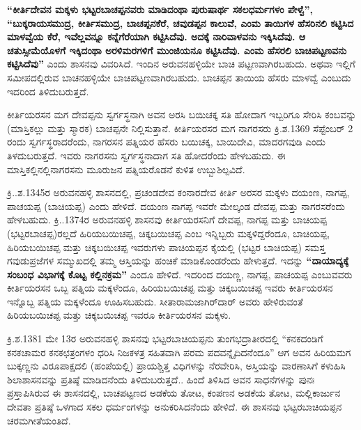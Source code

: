\textbf{“ಕೀರ್ತಿದೇವನ ಮಕ್ಕಳು ಭಟ್ಟರಬಾಚಪ್ಪನವರು ಮಾಡಿದಂಥಾ ಪುರುಷಾರ್ಥ ಸಕಲಧರ್ಮಗಳಂ ಪೇಳ್ವೆ”,\general{\break } “ಬುಕ್ಕರಾಯಸಮುದ್ರ, ಕೀರ್ತಿಸಮುದ್ರ, ಬಾಚಪ್ಪನಕೆರೆ, ಚವುಡಪ್ಪನ ಕಾಲುವೆ, ಎಂಮ ತಾಯಿಗಳ ಹೆಸರಿನಲಿ ಕಟ್ಟಿಸಿದ ಮಾಳವ್ವೆಯ ಕೆರೆ, ಇವೆಲ್ಲವನ್ನೂ ಕನ್ನೆಗೆರೆಯಾಗಿ ಕಟ್ಟಿಸಿದೆವು. ಅದಕ್ಕೆ ನಾರಿವಾಳವನು ಇಕ್ಕಿಸಿದೆವು. ಆ ಚತುಸ್ಸೀಮೆಯೊಳಗೆ ಇಕ್ಕಿದಂಥಾ ಅರಳಿಮರಗಳಿಗೆ ಮುಂಜಿಯನೂ ಕಟ್ಟಿಸಿದೆವು. ಎಂಮ ಹೆಸರಲಿ ಬಾಚಿಪಟ್ಟಣವನು ಕಟ್ಟಿಸಿದೆವು”} ಎಂದು ಶಾಸನವು ವಿವರಿಸಿದೆ. ಇಂದಿನ ಅರುವನಹಳ್ಳಿಯೇ ಬಾಚಿ ಪಟ್ಟಣವಾಗಿರಬಹುದು. ಅಥವಾ ಇಲ್ಲಿಗೆ ಸಮೀಪದಲ್ಲಿರುವ ಬಾಚನಹಳ್ಳಿಯೇ ಬಾಚಿಪಟ್ಟಣವಾಗಿರಬಹುದು. ಬಾಚಪ್ಪನ ತಾಯಿಯ ಹೆಸರು ಮಾಳವ್ವೆ ಎಂಬುದು ಇದರಿಂದ ತಿಳಿದುಬರುತ್ತದೆ.

ಕೀರ್ತಿಯರಸನ ಮಗ ದೇವಪ್ಪನು ಸ್ವರ್ಗಸ್ಥನಾಗಿ ಅವನ ಅರಸಿ ಬಯಿಚಕ್ಕ ಸತಿ ಹೋದಾಗ ಇಬ್ಬರಿಗೂ ಸೇರಿಸಿ ಕಂಬವನ್ನು (ಮಾಸ್ತಿಕಲ್ಲು ಮತ್ತು ಸ್ಮಾರಕ) ಬಾಚಪ್ಪನೇ ನಿಲ್ಲಿಸುತ್ತಾನೆ. ಕೀರ್ತಿಯರಸರ ಮಗ ನಾಗರಸರು ಕ್ರಿ.ಶ.1369 ಸೆಪ್ಟೆಂಬರ್​ 2 ರಂದು ಸ್ವರ್ಗಸ್ಥರಾದರೆಂದು, ನಾಗರಸನ ಪತ್ನಿಯರ ಹೆಸರು ಬಯಿಚಕ್ಕ, ಬಾಯಿದೇವಿ, ಮಾದರಗವುಡಿ ಎಂದು ತಿಳದುಬರುತ್ತದೆ. ಇವರು ನಾಗರಸನು ಸ್ವರ್ಗಸ್ಥನಾದಾಗ ಸತಿ ಹೋದರೆಂದು ಹೇಳಬಹುದು. ಈ ಮಾಸ್ತಿಕಲ್ಲಿನಲ್ಲಿ\break ನಾಗರಸನು ಮೂರುಜನ ಪತ್ನಿಯರೊಡನೆ ಕುಳಿತ ಉಬ್ಬುಶಿಲ್ಪವಿದೆ.

ಕ್ರಿ..ಶ.1345ರ ಅರುವನಹಳ್ಳಿ ಶಾಸನದಲ್ಲಿ, ಪ್ರಚಂಡದೇವ ಕಂನಾರದೇವ ಕೀರ್ತಿ ಅರಸರ ಮಕ್ಕಳು ದಯಂಣ, ನಾಗಪ್ಪ, ಪಾಚಯಪ್ಪ (ಬಾಚಿಯಪ್ಪ) ಎಂದು ಹೇಳಿದೆ. ದಯಂಣ ನಾಗಪ್ಪ ಇವರೇ ಮೇಲ್ಕಂಡ ದೇವಪ್ಪ ಮತ್ತು ನಾಗರಸರೆಂದು ಹೇಳಬಹುದು. ಕ್ರಿ..1374ರ ಅರುವನಹಳ್ಳಿ ಶಾಸನವು ಕೀರ್ತಿಯರಸನಿಗೆ ದೇವಪ್ಪ, ನಾಗಪ್ಪ ಮತ್ತು ಬಾಚಿಯಪ್ಪ (ಭಟ್ಟರಬಾಚಪ್ಪ)ರಲ್ಲದೆ ಹಿರಿಯಬಯಿಚಪ್ಪ, ಚಿಕ್ಕಬಯಿಚಪ್ಪ ಎಂಬ ಇನ್ನಿಬ್ಬರು ಮಕ್ಕಳಿದ್ದರೆಂದೂ, ಬಾಚಿಯಪ್ಪ, ಹಿರಿಯಬಯಿಚಪ್ಪ ಮತ್ತು ಚಿಕ್ಕಬಯಿಚಪ್ಪ ಇವರುಗಳು ಪಾಚಿಯಪ್ಪನ ಕೈಯಲ್ಲಿ (ಭಟ್ಟರ ಬಾಚಿಯಪ್ಪ) ಸಮಸ್ತ ಗವುಡುಪ್ರಜೆಗಳ ಸಮ್ಮುಖದಲ್ಲಿ ತಮ್ಮ ಆಸ್ತಿಯನ್ನು ಹಂಚಿಕೆ ಮಾಡಿಕೊಂಡರೆಂದು ಹೇಳುತ್ತದೆ. ಇದನ್ನು \textbf{“ದಾಯಾದ್ಯಕ್ಕೆ ಸಂಬಂಧ ವಿಭಾಗಕ್ಕೆ ಕೊಟ್ಟ ಕಲ್ಲಿನಕ್ರಮ”} ಎಂದೂ ಹೇಳಿದೆ. ಇದರಿಂದ ದಯಣ್ಣ, ನಾಗಪ್ಪ, ಪಾಚಯಪ್ಪ ಎಂಬುವವರು ಕೀರ್ತಿಯರಸನ ಒಬ್ಬ ಪತ್ನಿಯ ಮಕ್ಕಳೆಂದೂ, ಹಿರಿಯಬಯಿಚಪ್ಪ ಮತ್ತು ಚಿಕ್ಕಬಯಿಚಪ್ಪ ಇವರು ಕೀರ್ತಿಯರಸನ ಇನ್ನೊಬ್ಬ ಪತ್ನಿಯ ಮಕ್ಕಳೆಂದೂ ಊಹಿಸಬಹುದು. ಸೀತಾರಾಮಜಾಗಿರ್​ದಾರ್​ ಅವರು ಹೇಳಿರುವಂತೆ ಹಿರಿಯಬಯಿಚಪ್ಪ ಮತ್ತು ಚಿಕ್ಕಬಯಿಚಪ್ಪ ಇವರೂ ಕೀರ್ತಿಯರಸನ ಮಕ್ಕಳು.

ಕ್ರಿ.ಶ.1381 ಮೇ 13ರ ಅರುವನಹಳ್ಳಿ ಶಾಸನವು ಭಟ್ಟರಬಾಚಿಯಪ್ಪನು ತುಂಗಭದ್ರಾತೀರದಲ್ಲಿ “ಕನಕದಂಡಿಗೆ ಕನಕಚಾಮರ ಕನಕಛತ್ರಂಗಳಂ ಧರಿಸಿ ನಿಜಕಳತ್ರ ಸಹಿತವಾಗಿ ಪರಮ ಪದವನ್ನೈದಿದನೆಂದೂ” ಆಗ ಅವನ ಹಿರಿಯಮಗ ಬುಕ್ಕಣ್ಣನು ವಿರೂಪಾಕ್ಷದಲಿ (ಹಂಪೆಯಲ್ಲಿ) ಪ್ರಾಯಶ್ಚಿತ್ತ ವಿಧಿಗಳನ್ನು ನೆರವೇರಿಸಿ, ಅಸ್ತಿಯನ್ನು ವಾರಣಾಸಿಗೆ ಕಳುಹಿಸಿ ಶಿಲಾಶಾಸನವನ್ನು ಪ್ರತಿಷ್ಠೆ ಮಾಡಿದನೆಂದು ತಿಳಿದುಬರುತ್ತದೆ.. ಹಿಂದೆ ತಿಳಿಸಿದ ಅವನ ಸಾಧನೆಗಳನ್ನು ಪುನಃ ಪ್ರಸ್ತಾಪಿಸಿರುವ ಈ ಶಾಸನದಲ್ಲಿ, ಬಾಚಪಟ್ಟಣದ ಅಡಕೆಯ ತೋಟ, ಕಂಪಣನ ಅಡಕೆಯ ತೋಟ, ಮಲ್ಲಿಕಾರ್ಜುನ ದೇವತಾ ಪ್ರತಿಷ್ಠೆ ಒಳಗಾದ ಸಕಲ ಧರ್ಮಂಗಳನ್ನು ಅನುಕರಿಸಿದನೆಂದು ಹೇಳಿದೆ. ಈ ಶಾಸನವು ಭಟ್ಟರಬಾಚಿಯಪ್ಪನ ಚರಮಗೀತೆಯಂತಿದೆ.

